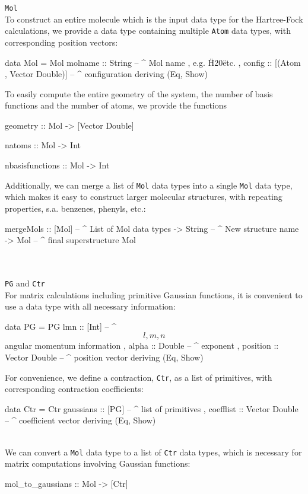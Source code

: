 \documentclass[twoside,        %
			   11pt,			%
               BCOR10mm,       %
               ngerman,english  %
               ]{scrartcl}
\begin{document}
\large{\texttt{Mol}}\\
To construct an entire molecule which is the input data type for the Hartree-Fock calculations, we provide a data type containing multiple \texttt{Atom} data types, with corresponding position vectors:
\begin{code}
data Mol = Mol {  molname :: String		-- ^ Mol name , e.g. \"H20\" etc.  
		, config :: [(Atom , Vector Double)] -- ^ configuration  
		} deriving (Eq, Show)
\end{code}
To easily compute the entire geometry of the system, the number of basis functions and the number of atoms, we provide the functions
\begin{code}
geometry :: Mol -> [Vector Double]

natoms :: Mol -> Int

nbasisfunctions :: Mol -> Int
\end{code}
Additionally, we can merge a list of \texttt{Mol} data types into a single \texttt{Mol} data type, which makes it easy to construct larger molecular structures, with repeating properties, s.a. benzenes, phenyls, etc.:
\begin{code}
mergeMols :: [Mol] -- ^ List of Mol data types
			-> String -- ^ New structure name
			-> Mol -- ^ final superstructure Mol
\end{code}\\ \\

\large{\texttt{PG} and \texttt{Ctr}}\\
For matrix calculations including primitive Gaussian functions, it is convenient to use a data type with all necessary information:
\begin{code}
data PG = PG { lmn :: [Int]	-- ^ \[l,m,n\] angular momentum information  
		, alpha :: Double -- ^ exponent  
		, position :: Vector Double -- ^ position vector  
		} deriving (Eq, Show)
\end{code}
For convenience, we define a contraction, \texttt{Ctr}, as a list of primitives, with corresponding contraction coefficients:
\begin{code}
data Ctr = Ctr{ gaussians :: [PG]	-- ^ list of primitives  
		, coefflist :: Vector Double -- ^ coefficient vector  
		} deriving (Eq, Show)
\end{code} \\

We can convert a \texttt{Mol} data type to a list of \texttt{Ctr} data types, which is necessary for matrix computations involving Gaussian functions:
\begin{code}
mol_to_gaussians :: Mol -> [Ctr]
\end{code}
\end{document}

